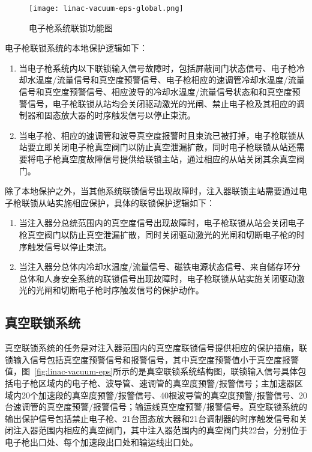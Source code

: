 \begin{figure}[!htb]
	\centering
	\texttt{[image: linac-vacuum-eps-global.png]}
	\caption{电子枪系统联锁功能图}
	\label{fig:linac-vacuum-eps-global}
\end{figure}

电子枪联锁系统的本地保护逻辑如下：

\begin{enumerate}
  \item 当电子枪系统内以下联锁输入信号故障时，包括屏蔽间门状态信号、电子枪冷却水温度/流量信号和真空度预警信号、电子枪相应的速调管冷却水温度/流量信号和真空度预警信号、相应波导的冷却水温度/流量信号状态和和真空度预警信号，电子枪联锁从站均会关闭驱动激光的光闸、禁止电子枪及其相应的调制器和固态放大器的时序触发信号以停止束流。

  \item 当电子枪、相应的速调管和波导真空度报警时且束流已被打掉，电子枪联锁从站要立即关闭电子枪真空阀门以防止真空泄漏扩散，同时电子枪联锁从站还需要将电子枪真空度故障信号提供给联锁主站，通过相应的从站关闭其余真空阀门。
  		
\end{enumerate}

除了本地保护之外，当其他系统联锁信号出现故障时，注入器联锁主站需要通过电子枪联锁从站实施相应保护，具体的联锁保护逻辑如下：

\begin{enumerate}
  \item 当注入器分总统范围内的真空度信号出现故障时，电子枪联锁从站会关闭电子枪真空阀门以防止真空泄漏扩散，同时关闭驱动激光的光闸和切断电子枪的时序触发信号以停止束流。

  \item 当注入器分总体内冷却水温度/流量信号、磁铁电源状态信号、来自储存环分总体和人身安全系统的联锁信号出现故障时，电子枪联锁从站实施关闭驱动激光的光闸和切断电子枪时序触发信号的保护动作。
  		
\end{enumerate}


\subsection{真空联锁系统}

真空联锁系统的任务是对注入器范围内的真空度联锁信号提供相应的保护措施，联锁输入信号包括真空度预警信号和报警信号，其中真空度预警值小于真空度报警值，图~\ref{fig:linac-vacuum-eps}所示的是真空联锁系统结构图，联锁输入信号具体包括电子枪区域内的电子枪、波导管、速调管的真空度预警/报警信号；主加速器区域内20个加速段的真空度预警/报警信号、40根波导管的真空度预警/报警信号、20台速调管的真空度预警/报警信号；输运线真空度预警/报警信号。真空联锁系统的输出保护信号包括禁止电子枪、21台固态放大器和21台调制器的时序触发信号和关闭注入器范围内相应的真空阀门，其中注入器范围内的真空阀门共22台，分别位于电子枪出口处、每个加速段出口处和输运线出口处\cite{wwei2014}。

